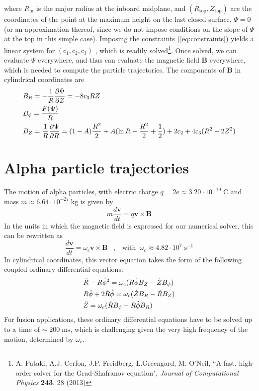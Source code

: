 \documentclass[a4]{article}
\begin{document}
where $R_{\mathrm{in}}$ is the major radius at the inboard midplane, and $(R_{\mathrm{top}} , Z_{\mathrm{top}})$ are the coordinates of the point at
the maximum height on the last closed surface, $\Psi = 0$ (or an approximation thereof, since we do not impose conditions on the slope of $\Psi$ at the top in this simple case). Imposing the constraints (\ref{eq:constraints}) yields a linear
system for $(c_{1}, c_{2}, c_{3})$ , which is readily solved\footnote{A. Pataki, A.J. Cerfon, J.P. Freidberg, L.Greengard, M. O'Neil, ``A fast, high-order solver for the Grad-Shafranov equation", \textit{Journal of Computational Physics} \textbf{243}, 28 (2013)}.
Once solved, we can evaluate $\Psi$ everywhere, and thus can evaluate the magnetic field $\mathbf{B}$ everywhere, which is needed to compute the particle trajectories. The components of $\mathbf{B}$ in cylindrical coordinates are
\begin{align}
&B_{R}=-\frac{1}{R}\frac{\partial\Psi}{\partial Z}=-8c_{3}RZ\notag\\
&B_{\phi}=\frac{F(\Psi)}{R}\\
&B_{Z}=\frac{1}{R}\frac{\partial\Psi}{\partial R}=(1-A)\frac{R^2}{2}+A(\ln R-\frac{R^2}{2}+\frac{1}{2})+2c_{2}+4c_{3}(R^2-2Z^2)\notag
\end{align}

\section{Alpha particle trajectories}
The motion of alpha particles, with electric charge $q=2e\approx 3.20\cdot 10^{-19}\;\mbox{C}$ and mass $m\approx 6.64\cdot 10^{-27}\;\mbox{kg}$ is given by
\begin{equation}
m\frac{d\mathbf{v}}{dt}=q\mathbf{v}\times\mathbf{B}
\end{equation}
In the units in which the magnetic field is expressed for our numerical solver, this can be rewritten as
\begin{equation}
\frac{d\mathbf{v}}{dt}=\omega_{c}\mathbf{v}\times\mathbf{B}\;\;\;,\;\;\;\mbox{with}\;\;\omega_{c}\approx 4.82\cdot 10^7\;\mbox{s}^{-1}
\end{equation}
In cylindrical coordinates, this vector equation takes the form of the following coupled ordinary differential equations:
\begin{align}
&\ddot{R}-R\dot{\phi}^2=\omega_{c}(R\dot{\phi}B_{Z}-\dot{Z}B_{\phi})\notag\\
&R\ddot{\phi}+2\dot{R}\dot{\phi}=\omega_{c}(\dot{Z}B_{R}-\dot{R}B_{Z})\label{eq:trajectories}\\
&\ddot{Z}=\omega_{c}(\dot{R}B_{\phi}-R\dot{\phi}B_{R})\notag
\end{align}
For fusion applications, these ordinary differential equations have to be solved up to a time of $\sim\; 200\;\mbox{ms}$, which is challenging given the very high frequency of the motion, determined by $\omega_{c}$.
\end{document}
